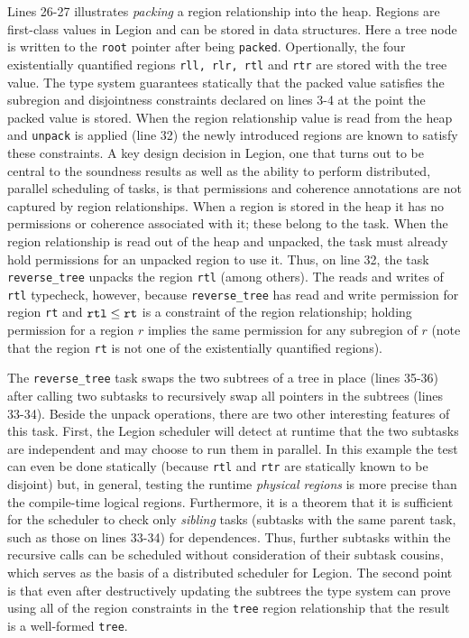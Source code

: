 Lines 26-27 illustrates {\em packing} a region relationship into the heap.
Regions are first-class values in Legion and can be stored in data structures.
Here a tree node is written to the {\tt root} pointer after being {\tt packed}.
Opertionally, the four existentially quantified regions {\tt rll, rlr, rtl} and {\tt rtr} are
stored with the tree value.  The type system guarantees statically that the packed value
satisfies the subregion and disjointness constraints declared on lines 3-4 at the point
the packed value is stored.  When the region relationship value is read 
from the heap and {\tt unpack} is applied (line 32) the newly introduced regions are known to 
satisfy these constraints.  A key design decision in Legion, one that turns out to be
central to the soundness results as well as the ability to perform distributed, parallel
scheduling of tasks, is that permissions and coherence annotations 
are not captured by region relationships.  When a region is stored in the heap it has no
permissions or coherence associated with it; these belong to the task.  When the region relationship
is read out of the heap and unpacked, the task must already hold permissions for an unpacked region 
to use it. Thus, on line 32, the task {\tt reverse\_tree} unpacks the region {\tt rtl} (among others).
The reads and writes of {\tt rtl} typecheck, however, because {\tt reverse\_tree} has read and
write permission for region {\tt rt} and $\tt rtl \leq rt$ is a constraint of the region relationship; holding
permission for a region $r$ implies the same permission for any subregion of $r$ (note
that the region {\tt rt} is not one of the existentially quantified regions).

The {\tt reverse\_tree} task swaps the two subtrees of a tree in place (lines 35-36) after calling two
subtasks to recursively swap all pointers in the subtrees (lines 33-34).  Beside the unpack operations, there
are two other interesting features of this task.  First, the Legion scheduler will detect at runtime that the two
subtasks are independent and may choose to run them in parallel.  In this example the test can even be done
statically (because {\tt rtl} and {\tt rtr} are statically known to be disjoint) but, in general, testing the
runtime {\em physical regions} is more precise than the compile-time logical regions.  Furthermore, it is a theorem
that it is sufficient for the scheduler to check only {\em sibling} tasks (subtasks with the same parent task,
such as those on lines 33-34) for dependences.  Thus, further subtasks within the recursive calls can be scheduled
without consideration of their subtask cousins, which serves as the basis of a distributed scheduler for Legion.
The second point is that
even after destructively updating the subtrees the type system can prove using all of the region constraints in the
{\tt tree} region relationship that the result is a well-formed {\tt tree}.

